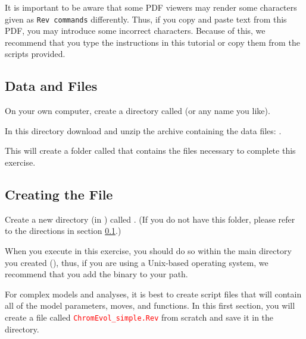 It is important to be aware that some PDF viewers may render some characters given as \colorbox{shadecolor}{\tt{Rev commands}} differently. 
Thus, if you copy and paste text from this PDF, you may introduce some incorrect characters. 
Because of this, we recommend that you type the instructions in this tutorial or copy them from the scripts provided. 


\medskip
\subsection{Data and Files}\label{subsect:Exercise-DataFiles}

{\begin{framed}
On your own computer, create a directory called {\textcolor{red}{}} (or any name you like). 

In this directory download and unzip the archive containing the data files: \href{http://rawgit.com/revbayes/revbayes_tutorial/master/RB_Chromosome_Evolution_Tutorial/data.zip}{}.

This will create a folder called  that contains the files necessary to complete this exercise.

\end{framed}}


\bigskip
\subsection{Creating the \Rev File}\label{subsect:Exercise-CreatingFiles}

{\begin{framed}
Create a new directory (in ) called {\textcolor{red}{}}. (If you do not have this folder, please refer to the directions in section \ref{subsect:Exercise-DataFiles}.)
\end{framed}}

When you execute \RevBayes in this exercise, you should do so within the main directory you created (), thus, if you are using a Unix-based operating system, we recommend that you add the \RevBayes binary to your path.
\bigskip

For complex models and analyses, it is best to create \Rev script files that will contain all of the model parameters, moves, and functions. 
In this first section, you will create a file called \textcolor{red}{\texttt{ChromEvol\_simple.Rev}} from scratch and save it in the  directory.

